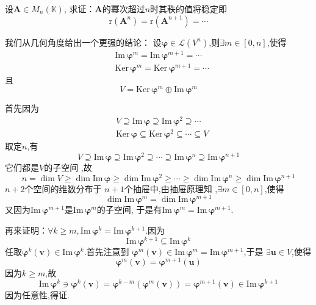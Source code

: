 \begin{brown}
\begin{example}\label{ex:像空间与核空间稳定}
    设$\bm{A}\in M_n\left(\mathbb{K}\right)$,
    求证：$\bm{A}$的幂次超过$n$时其秩的值将稳定即
    \[
    \mathrm{r}\left(\bm{A}^n\right)=\mathrm{r}\left(
        \bm{A}^{n+1}
    \right)=\cdots
    \]
\end{example}
\begin{Proof}
我们从几何角度给出一个更强的结论：
设$\bm{\varphi}\in \mathcal{L}
\left(V^n\right)$,则$\exists m \in \left[
    0,n
\right]$,使得
\begin{align*}
    &\mathrm{Im}\,\bm{\varphi}^m=\mathrm{Im}\,\bm{\varphi}^{m+1}=\cdots\\
    &\mathrm{Ker}\,\bm{\varphi}^m=\mathrm{Ker}\,\bm{\varphi}^{m+1}=\cdots
\end{align*}
且\[
V=\mathrm{Ker}\,\bm{\varphi}^m\oplus \mathrm{Im}\,\bm{\varphi}^m
\]

首先因为
\begin{align*}
        &V\supseteq \mathrm{Im}\,\bm{\varphi}\supseteq \mathrm{Im}\,\bm{\varphi}^2\supseteq \cdots\\
        &\mathrm{Ker}\,\bm{\varphi}\subseteq \mathrm{Ker}\,\bm{\varphi}^2\subseteq \cdots\subseteq V
    \end{align*}
    取定$n$,有
    \[
    V\supseteq \mathrm{Im}\,\bm{\varphi}\supseteq \mathrm{Im}\,\bm{\varphi}^2\supseteq \cdots \supseteq \mathrm{Im}\,\bm{\varphi}^n\supseteq \mathrm{Im}\,\bm{\varphi}^{n+1}
    \]
    它们都是$V$的子空间
    ,故
    \[
    n = \dim V\geqslant \dim 
    \mathrm{Im}\,\bm{\varphi}\geqslant\dim
     \mathrm{Im}\,\bm{\varphi}^2\geqslant 
      \cdots \geqslant\dim
       \mathrm{Im}\,\bm{\varphi}^n\geqslant\dim
        \mathrm{Im}\,\bm{\varphi}^{n+1}
    \]
    $n+2$个空间的维数分布于
    $n+1$个抽屉中,由抽屉原理知
    ,$\exists m \in \left[0,n\right]$,使得
    \[
    \dim \mathrm{Im}\,\bm{\varphi}^m=\dim \mathrm{Im}\,\bm{\varphi}^{m+1}
    \]
    又因为$\mathrm{Im}\,\bm{\varphi}^{m+1}$是$\mathrm{Im}\,\bm{\varphi}^m$的子空间,
    于是有$\mathrm{Im}\,\bm{\varphi}^m=\mathrm{Im}\,\bm{\varphi}^{m+1}.$

    再来证明：$\forall k \geqslant m,\mathrm{Im}\,\bm{\varphi}^k=\mathrm{Im}\,\bm{\varphi}^{k+1}$.因为
    \[
    \mathrm{Im}\,\bm{\varphi}^{k+1}\subseteq \mathrm{Im}\,\bm{\varphi}^k
    \]
    任取$\bm{\varphi}^k\left(\bm{v}\right)\in \mathrm{Im}\,
    \bm{\varphi}^k$.首先注意到
    $\bm{\varphi}^m\left(\bm{v}\right)\in \mathrm{Im}\,\bm{\varphi}^m = \mathrm{Im}\,\bm{\varphi}^{m+1}$,于是
    $\exists \bm{u}\in V$,使得\[
    \bm{\varphi}^m\left(\bm{v}\right)=\bm{\varphi}^{m+1}\left(\bm{u}\right)
    \]
    因为$k \geqslant m$,故
    \[
    \mathrm{Im}\,\bm{\varphi}^k\ni 
    \bm{\varphi}^k\left(\bm{v}\right)=
    \bm{\varphi}^{k-m}\left(\bm{\varphi}^m\left(\bm{v}\right)\right)=
    \bm{\varphi}^{m+1}\left(\bm{v}\right)\in \mathrm{Im}\,\bm{\varphi}^{k+1}
    \]
    因为任意性,得证.


\end{Proof}
\end{brown}
